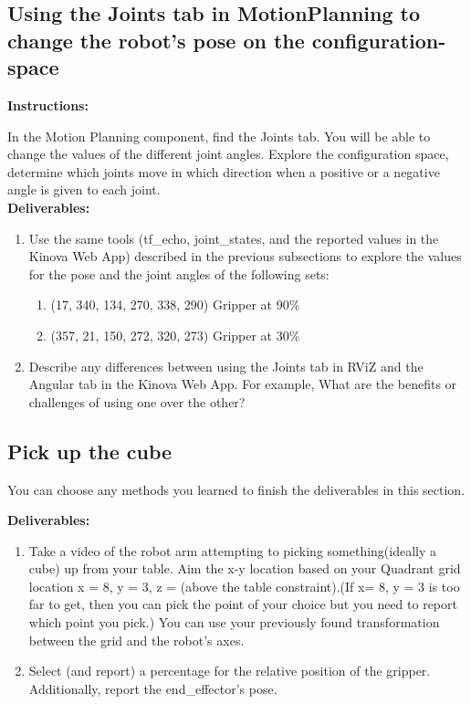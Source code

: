 \documentclass[12pt]{article}
\begin{document}
\subsection{Using the Joints tab in MotionPlanning to change the robot’s pose on the configuration-space}


\textbf{Instructions:}

In the Motion Planning component, find the Joints tab. You will be able to change the values of the different joint angles. Explore the configuration space, determine which joints move in which direction when a positive or a negative angle is given to each joint.\\

\textbf{Deliverables:}
\begin{enumerate}
    \item Use the same tools (tf\_echo, joint\_states, and the reported values in the Kinova Web App) described in the previous subsections to explore the values for the pose and the joint angles of the following sets:
    \begin{enumerate}
        \item (17, 340, 134, 270, 338, 290) Gripper at 90\%
        \item (357, 21, 150, 272, 320, 273) Gripper at 30\%
    \end{enumerate}
    
    \item Describe any differences between using the Joints tab in RViZ and the Angular tab in the Kinova Web App. For example, What are the benefits or challenges of using one over the other?

\end{enumerate}


\subsection{Pick up the cube}
You can choose any methods you learned to finish the deliverables in this section.

\textbf{Deliverables:}
\begin{enumerate}
    \item Take a video of the robot arm attempting to picking something(ideally a cube) up from your table. Aim the x-y location based on your Quadrant grid location x = 8, y = 3, z = (above the table constraint).(If x= 8, y = 3 is too far to get, then you can pick the point of your choice but you need to report which point you pick.) You can use your previously found transformation between the grid and the robot’s axes.
    
    \item Select (and report) a percentage for the relative position of the gripper. Additionally, report the end\_effector’s pose. 
\end{enumerate}
\end{document}
